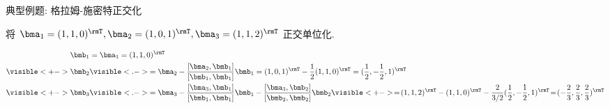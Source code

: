 \begin{frame}{典型例题: 格拉姆-施密特正交化}\small
	\onslide<+->
	\begin{example}
		将 $\bma_1=(1,1,0)^\rmT,\bma_2=(1,0,1)^\rmT,\bma_3=(1,1,2)^\rmT$ 正交单位化.
	\end{example}
	\onslide<+->
	\begin{solution}
		\begin{align*}
			\bmb_1&=\bma_1=(1,1,0)^\rmT\\
			\visible<+->{\bmb_2}&\visible<.->{=\bma_2-\frac{[\bma_2,\bmb_1]}{[\bmb_1,\bmb_1]}\bmb_1=(1,0,1)^\rmT-\frac12(1,1,0)^\rmT=(\frac12,-\frac12,1)^\rmT}\\
			\visible<+->{\bmb_3}&\visible<.->{=\bma_3-\frac{[\bma_3,\bmb_1]}{[\bmb_1,\bmb_1]}\bmb_1-\frac{[\bma_3,\bmb_2]}{[\bmb_2,\bmb_2]}\bmb_2}
			\visible<+->{\!=\!(1,1,2)^\rmT-(1,1,0)^\rmT-\frac2{3/2}(\frac12,-\frac12,1)^\rmT
			\!=\!(-\frac23,\frac23,\frac23)^\rmT}
		\end{align*}
		\onslide<+->{%
			\[
			\bfe_1=\dfrac{\bmb_1}{\|\bmb_1\|}
				=\frac1{\sqrt2}(1,1,0)^\rmT,\quad
			\bfe_2=\dfrac{\bmb_2}{\|\bmb_2\|}
				=\frac1{\sqrt6}(1,-1,2)^\rmT,\quad
			\bfe_3=\dfrac{\bmb_3}{\|\bmb_3\|}
				=\frac1{\sqrt3}(-1,1,1)^\rmT.
		\]}
	\end{solution}
\end{frame}

